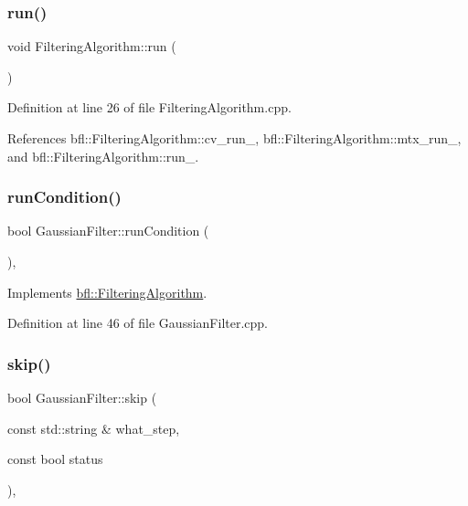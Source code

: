 \subsubsection{\texorpdfstring{run()}{run()}}
{\footnotesize\ttfamily void Filtering\+Algorithm\+::run (\begin{DoxyParamCaption}{ }\end{DoxyParamCaption})\hspace{0.3cm}{\ttfamily [inherited]}}



Definition at line 26 of file Filtering\+Algorithm.\+cpp.



References bfl\+::\+Filtering\+Algorithm\+::cv\+\_\+run\+\_\+, bfl\+::\+Filtering\+Algorithm\+::mtx\+\_\+run\+\_\+, and bfl\+::\+Filtering\+Algorithm\+::run\+\_\+.

\mbox{\label{classbfl_1_1GaussianFilter_acf6902f6156c573560b57f10c1992b8a}} 
\subsubsection{\texorpdfstring{run\+Condition()}{runCondition()}}
{\footnotesize\ttfamily bool Gaussian\+Filter\+::run\+Condition (\begin{DoxyParamCaption}{ }\end{DoxyParamCaption})\hspace{0.3cm}{\ttfamily [override]}, {\ttfamily [virtual]}}



Implements \mbox{\hyperlink{classbfl_1_1FilteringAlgorithm_a5fc12882356f6906b102fbfff2bc4b7c}{bfl\+::\+Filtering\+Algorithm}}.



Definition at line 46 of file Gaussian\+Filter.\+cpp.

\mbox{\label{classbfl_1_1GaussianFilter_a3ca79ee1451863d898baeea6a74ababd}} 
\subsubsection{\texorpdfstring{skip()}{skip()}}
{\footnotesize\ttfamily bool Gaussian\+Filter\+::skip (\begin{DoxyParamCaption}\item[{const std\+::string \&}]{what\+\_\+step,  }\item[{const bool}]{status }\end{DoxyParamCaption})\hspace{0.3cm}{\ttfamily [override]}, {\ttfamily [virtual]}}



